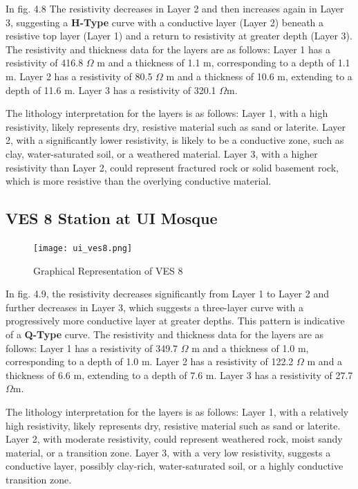 \documentclass[12pt,a4paper]{report}
\begin{document}
In fig. 4.8 The resistivity decreases in Layer 2 and then increases again in Layer 3, suggesting a \textbf{H-Type} curve with a conductive layer (Layer 2) beneath a resistive top layer (Layer 1) and a return to resistivity at greater depth (Layer 3). The resistivity and thickness data for the layers are as follows: Layer 1 has a resistivity of 416.8 $\Omega$ m and a thickness of 1.1 m, corresponding to a depth of 1.1 m. Layer 2 has a resistivity of 80.5 $\Omega$ m and a thickness of 10.6 m, extending to a depth of 11.6 m. Layer 3 has a resistivity of 320.1 $\Omega$m.

The lithology interpretation for the layers is as follows: Layer 1, with a high resistivity, likely represents dry, resistive material such as sand or laterite. Layer 2, with a significantly lower resistivity, is likely to be a conductive zone, such as clay, water-saturated soil, or a weathered material. Layer 3, with a higher resistivity than Layer 2, could represent fractured rock or solid basement rock, which is more resistive than the overlying conductive material.

\subsection{VES 8 Station at UI Mosque}

\begin{figure}[H]
    \centering
    \texttt{[image: ui\_ves8.png]}
    \caption{Graphical Representation of VES 8}
    \label{fig:VES_8_Curve}
\end{figure}

In fig. 4.9, the resistivity decreases significantly from Layer 1 to Layer 2 and further decreases in Layer 3, which suggests a three-layer curve with a progressively more conductive layer at greater depths. This pattern is indicative of a \textbf{Q-Type} curve. The resistivity and thickness data for the layers are as follows: Layer 1 has a resistivity of 349.7 $\Omega$ m and a thickness of 1.0 m, corresponding to a depth of 1.0 m. Layer 2 has a resistivity of 122.2 $\Omega$ m and a thickness of 6.6 m, extending to a depth of 7.6 m. Layer 3 has a resistivity of 27.7 $\Omega$m.

The lithology interpretation for the layers is as follows: Layer 1, with a relatively high resistivity, likely represents dry, resistive material such as sand or laterite. Layer 2, with moderate resistivity, could represent weathered rock, moist sandy material, or a transition zone. Layer 3, with a very low resistivity, suggests a conductive layer, possibly clay-rich, water-saturated soil, or a highly conductive transition zone.
\end{document}
